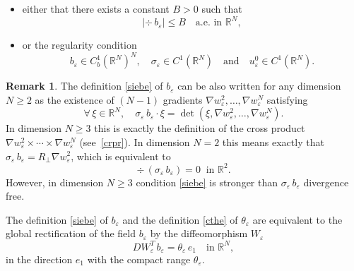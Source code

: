\documentclass[11pt]{article}
\let \si \sigma
\def \RR {\mathbb R}
\theoremstyle{plain}
\theoremstyle{definition}
\newtheorem{Rem}[Thm]{Remark}
\numberwithin{equation}{section}
\begin{document}
\begin{itemize}
\item either that there exists a constant $B>0$ such that
\begin{equation}\label{beB}
|\div\,b_\varepsilon|\leq B\quad\mbox{a.e. in }\RR^N,
\end{equation}
\item or the regularity condition
\begin{equation}\label{rsiebe}
b_\varepsilon\in C^1_b(\RR^N)^N,\quad \sigma_\varepsilon\in C^1(\RR^N)\quad\mbox{and}\quad u_\varepsilon^0\in C^1(\RR^N).
\end{equation}
\end{itemize}
\begin{Rem}\label{rem.rec}
The definition \eqref{siebe} of $b_\varepsilon$ can be also written for any dimension $N\geq 2$ as the existence of $(N-1)$ gradients $\nabla w_\varepsilon^2,\dots,\nabla w_\varepsilon^N$ satisfying
\begin{equation}\label{siebe2}
\forall\,\xi\in\RR^N,\quad \si_\varepsilon\,b_\varepsilon\cdot\xi=\det\left(\xi,\nabla w_\varepsilon^2,\dots,\nabla w_\varepsilon^N\right).
\end{equation}
In dimension $N\geq 3$ this is exactly the definition of the cross product $\nabla w_\varepsilon^2\times\cdots\times\nabla w_\varepsilon^N$ (see~\eqref{crpr}). In dimension $N=2$ this means exactly that $\si_\varepsilon\,b_\varepsilon=R_\perp\nabla w_\varepsilon^2$, which is equivalent to
\begin{equation}\label{divsiebe}
\div\,(\sigma_\varepsilon\,b_\varepsilon)=0\;\;\mbox{in }\RR^2.
\end{equation}
However, in dimension $N\geq 3$ condition \eqref{siebe} is stronger than $\sigma_\varepsilon\,b_\varepsilon$ divergence free.

The definition \eqref{siebe} of $b_\varepsilon$ and the definition \eqref{cthe} of $\theta_\varepsilon$ are equivalent to the global rectification of the field $b_\varepsilon$ by the diffeomorphism $W_\varepsilon$
\begin{equation}\label{DWebe}
DW_\varepsilon^T\,b_\varepsilon=\theta_\varepsilon\,e_1\quad\mbox{in }\RR^N,
\end{equation}
in the direction $e_1$ with the compact range $\theta_\varepsilon$.
\end{Rem}
\end{document}
